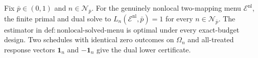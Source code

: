 Fix \(\bar p\in(0,1)\) and \(n\in\mathcal N_{\bar p}\). For the genuinely nonlocal two-mapping menu \(\mathcal E^{\mathrm{nl}}\), the finite primal and dual solve to \(L_n(\mathcal E^{\mathrm{nl}},\bar p)=1\) for every \(n\in\mathcal N_{\bar p}\). The estimator in \(\mathrm{def{:}nonlocal\text{-}solved\text{-}menu}\) is optimal under every exact-budget design. Two schedules with identical zero outcomes on \(\Omega_n\) and all-treated response vectors \(\mathbf 1_n\) and \(-\mathbf 1_n\) give the dual lower certificate.